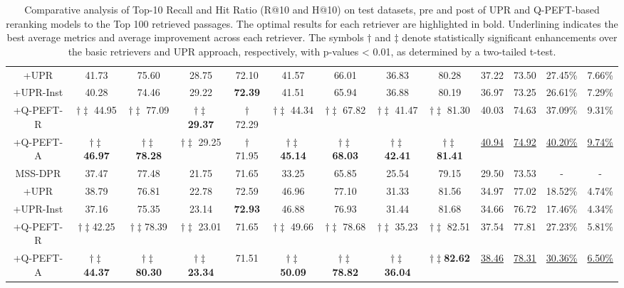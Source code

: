 \documentclass[sigconf,natbib=true,anonymous=false]{acmart}
\begin{document}
\begin{table}[!htbp]
{\begin{tabular}{c|cc|cc|cc|cc|cc|cc}
+UPR            &41.73 &75.60 & 28.75  & 72.10  & 41.57   & 66.01   & 36.83    & 80.28    & 37.22 & 73.50 & 27.45\% & 7.66\%\\
+UPR-Inst       &40.28 &74.46 & 29.22  & \textbf{72.39}  & 41.51   & 65.94   & 36.88    & 80.19    & 36.97 & 73.25 & 26.61\% & 7.29\%\\
+Q-PEFT-R          &$\dagger \ddagger$ 44.95 &$\dagger \ddagger$ 77.09 &$\dagger \ddagger$  \textbf{29.37}  &$\dagger$  72.29  &$\dagger \ddagger$  44.34   &$\dagger \ddagger$  67.82   &$\dagger \ddagger$  41.47    &$\dagger \ddagger$  81.30    & 40.03 & 74.63 & 37.09\% & 9.31\%\\
+Q-PEFT-A        &$\dagger \ddagger$ \textbf{46.97} &$\dagger \ddagger$ \textbf{78.28} &$\dagger \ddagger$  29.25  &$\dagger$  71.95  &$\dagger \ddagger$  \textbf{45.14}   &$\dagger \ddagger$  \textbf{68.03}   &$\dagger \ddagger$  \textbf{42.41}    &$\dagger \ddagger$  \textbf{81.41}    & \underline{40.94} & \underline{74.92} & \underline{40.20\%} & \underline{9.74\%}\\
\midrule
MSS-DPR         &37.47 &77.48 & 21.75  & 71.65  & 33.25   & 65.85   & 25.54    & 79.15    & 29.50 & 73.53 & - & -\\
+UPR            &38.79 &76.81 & 22.78  & 72.59  & 46.96   & 77.10   & 31.33    & 81.56    & 34.97 & 77.02 & 18.52\% & 4.74\%\\
+UPR-Inst       &37.16 &75.35 & 23.14  & \textbf{72.93}  & 46.88   & 76.93   & 31.44    & 81.68    & 34.66 & 76.72 & 17.46\% & 4.34\%\\
+Q-PEFT-R          &$\dagger \ddagger$42.25 &$\dagger \ddagger$78.39 &$\dagger \ddagger$  23.01  &  71.65  &$\dagger \ddagger$  49.66   &$\dagger \ddagger$  78.68   &$\dagger \ddagger$  35.23    &$\dagger \ddagger$  82.51    & 37.54 & 77.81 & 27.23\% & 5.81\%\\
+Q-PEFT-A        &$\dagger \ddagger$ \textbf{44.37} &$\dagger \ddagger$ \textbf{80.30} &$\dagger \ddagger$  \textbf{23.34}  &  71.51  &$\dagger \ddagger$  \textbf{50.09}   &$\dagger \ddagger$  \textbf{78.82}   &$\dagger \ddagger$  \textbf{36.04}    &  \textbf{$\dagger \ddagger$82.62}    & \underline{38.46} & \underline{78.31} & \underline{30.36\%} & \underline{6.50\%}\\
\bottomrule
\end{tabular}
}
\caption{Comparative analysis of Top-10 Recall and Hit Ratio (R@10 and H@10) on test datasets, pre and post of UPR and Q-PEFT-based reranking models to the Top 100 retrieved passages. The optimal results for each retriever are highlighted in bold. Underlining indicates the best average metrics and average improvement across each retriever. The symbols $\dagger$ and $\ddagger$ denote statistically significant enhancements over the basic retrievers and UPR approach, respectively, with p-values < 0.01, as determined by a two-tailed t-test.}
\label{tab: main}
\end{table}
\end{document}
